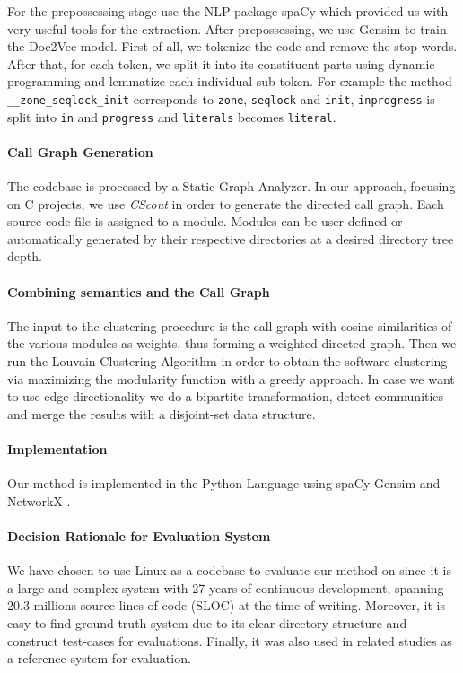 \documentclass[sigconf,review, anonymous]{acmart}
\begin{document}
For the prepossessing stage use the NLP package spaCy \cite{spacy} which provided us with very useful tools for the extraction. 
After prepossessing, we use Gensim \cite{gensim} to train the Doc2Vec model. 
First of all, we tokenize the code and remove the stop-words. 
After that, for each token, we split it into its constituent parts using dynamic programming and lemmatize 
each individual sub-token. 
For example the method \texttt{\_\_zone\_seqlock\_init} corresponds to \texttt{zone}, \texttt{seqlock} and \texttt{init}, 
\texttt{inprogress} is split into \texttt{in} and \texttt{progress} and \texttt{literals} becomes \texttt{literal}.

\paragraph{Call Graph Generation} 
The codebase is processed by a Static Graph Analyzer. 
In our approach, focusing on C projects, we use \emph{CScout} \cite{cscout} in order to generate the directed call graph. 
Each source code file is assigned to a module. 
Modules can be user defined or automatically generated by their respective directories at a desired directory tree depth. 

\paragraph{Combining semantics and the Call Graph} 
The input to the clustering procedure
is the call graph with cosine similarities of the various modules as weights, thus forming a
weighted directed graph. Then we run the Louvain Clustering Algorithm \cite{louvain} in
order to obtain the software clustering via maximizing the modularity function with a greedy approach. 
In case we want to use edge directionality we do a bipartite transformation, detect communities and
merge the results with a disjoint-set data structure.
    

\paragraph{Implementation}  
Our method is implemented in the Python Language using spaCy\cite{spacy} Gensim \cite{gensim} and NetworkX \cite{nx}.

\paragraph{Decision Rationale for Evaluation System} 
We have chosen to use Linux as a codebase to evaluate our method on 
since it is a large and complex system with 27 years of continuous development, spanning 20.3 millions source lines of code (SLOC) at the time of writing.  
Moreover, it is easy to find ground truth system due to its clear directory structure and construct test-cases for
evaluations. 
Finally, it was also used in related studies \cite{acdc, evaluation} as a reference system for evaluation. 
\end{document}
